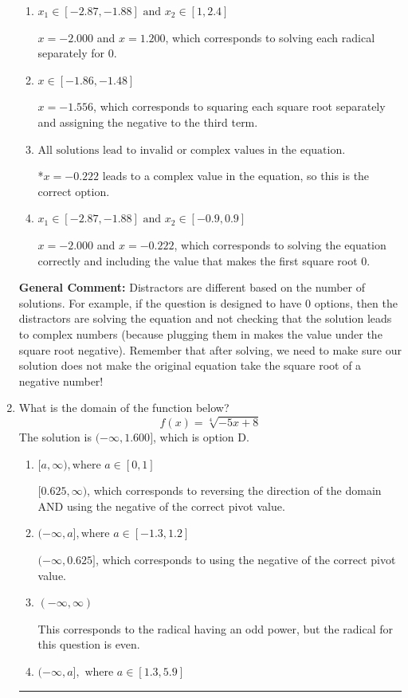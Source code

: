 \documentclass{extbook}[14pt]
\newcommand{\litem}[1]{\item #1

\rule{\textwidth}{0.4pt}}
\begin{document}
\begin{enumerate}
{\begin{enumerate}[label=\Alph*.]
This corresponds to not checking that the potential solution $x = -0.222$ leads to a complex value in the original equation.
\item \( x_1 \in [-2.87, -1.88] \text{ and } x_2 \in [1,2.4] \)

$x = -2.000$ and $x = 1.200$, which corresponds to solving each radical separately for 0.
\item \( x \in [-1.86,-1.48] \)

$x = -1.556$, which corresponds to squaring each square root separately and assigning the negative to the third term.
\item \( \text{All solutions lead to invalid or complex values in the equation.} \)

*$x = -0.222$ leads to a complex value in the equation, so this is the correct option.
\item \( x_1 \in [-2.87, -1.88] \text{ and } x_2 \in [-0.9,0.9] \)

$x = -2.000$ and $x = -0.222$, which corresponds to solving the equation correctly and including the value that makes the first square root 0.
\end{enumerate}

\textbf{General Comment:} Distractors are different based on the number of solutions. For example, if the question is designed to have 0 options, then the distractors are solving the equation and not checking that the solution leads to complex numbers (because plugging them in makes the value under the square root negative). Remember that after solving, we need to make sure our solution does not make the original equation take the square root of a negative number!
}
\litem{
What is the domain of the function below?
\[ f(x) = \sqrt[4]{-5 x + 8} \]The solution is \( (-\infty, 1.600] \), which is option D.\begin{enumerate}[label=\Alph*.]
\item \( [a, \infty), \text{where } a \in [0, 1] \)

$[0.625, \infty)$, which corresponds to reversing the direction of the domain AND using the negative of the correct pivot value.
\item \( (-\infty, a], \text{where } a \in [-1.3, 1.2] \)

$(-\infty, 0.625]$, which corresponds to using the negative of the correct pivot value.
\item \( (-\infty, \infty) \)

This corresponds to the radical having an odd power, but the radical for this question is even.
\item \( (-\infty, a], \text{ where } a \in [1.3, 5.9] \)


\end{enumerate}}
\end{enumerate}
\end{document}
